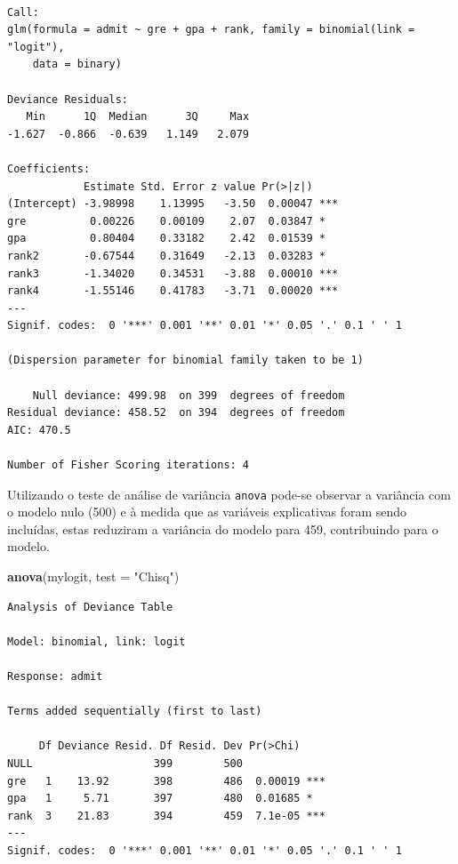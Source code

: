 \documentclass[12pt,brazil,oneside]{book}
\newenvironment{Shaded}{\begin{snugshade}}{\end{snugshade}}
\newcommand{\DataTypeTok}[1]{\textcolor[rgb]{0.13,0.29,0.53}{#1}}
\newcommand{\KeywordTok}[1]{\textcolor[rgb]{0.13,0.29,0.53}{\textbf{#1}}}
\newcommand{\NormalTok}[1]{#1}
\newcommand{\StringTok}[1]{\textcolor[rgb]{0.31,0.60,0.02}{#1}}
\begin{document}
\begin{verbatim}

Call:
glm(formula = admit ~ gre + gpa + rank, family = binomial(link = "logit"), 
    data = binary)

Deviance Residuals: 
   Min      1Q  Median      3Q     Max  
-1.627  -0.866  -0.639   1.149   2.079  

Coefficients:
            Estimate Std. Error z value Pr(>|z|)    
(Intercept) -3.98998    1.13995   -3.50  0.00047 ***
gre          0.00226    0.00109    2.07  0.03847 *  
gpa          0.80404    0.33182    2.42  0.01539 *  
rank2       -0.67544    0.31649   -2.13  0.03283 *  
rank3       -1.34020    0.34531   -3.88  0.00010 ***
rank4       -1.55146    0.41783   -3.71  0.00020 ***
---
Signif. codes:  0 '***' 0.001 '**' 0.01 '*' 0.05 '.' 0.1 ' ' 1

(Dispersion parameter for binomial family taken to be 1)

    Null deviance: 499.98  on 399  degrees of freedom
Residual deviance: 458.52  on 394  degrees of freedom
AIC: 470.5

Number of Fisher Scoring iterations: 4
\end{verbatim}

Utilizando o teste de análise de variância \texttt{anova} pode-se
observar a variância com o modelo nulo (500) e à medida que as variáveis
explicativas foram sendo incluídas, estas reduziram a variância do
modelo para 459, contribuindo para o modelo.

\begin{Shaded}
\begin{Highlighting}[]
\KeywordTok{anova}\NormalTok{(mylogit, }\DataTypeTok{test =} \StringTok{"Chisq"}\NormalTok{)}
\end{Highlighting}
\end{Shaded}

\begin{verbatim}
Analysis of Deviance Table

Model: binomial, link: logit

Response: admit

Terms added sequentially (first to last)

     Df Deviance Resid. Df Resid. Dev Pr(>Chi)    
NULL                   399        500             
gre   1    13.92       398        486  0.00019 ***
gpa   1     5.71       397        480  0.01685 *  
rank  3    21.83       394        459  7.1e-05 ***
---
Signif. codes:  0 '***' 0.001 '**' 0.01 '*' 0.05 '.' 0.1 ' ' 1
\end{verbatim}
\end{document}
